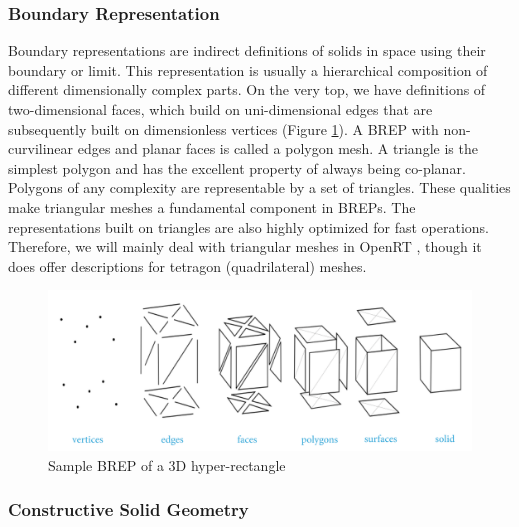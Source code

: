 \documentclass[a4paper,11pt,oneside]{article}
\begin{document}
\subsubsection{Boundary Representation}
    
Boundary representations are indirect definitions of solids in space using their boundary or limit. This representation is usually a hierarchical composition of different dimensionally complex parts. On the very top, we have definitions of two-dimensional faces, which build on uni-dimensional edges that are subsequently built on dimensionless vertices (Figure \ref{fig2:brep_3d_rect}). A BREP with non-curvilinear edges and planar faces is called a polygon mesh. A triangle is the simplest polygon and has the excellent property of always being co-planar. Polygons of any complexity are representable by a set of triangles. These qualities make triangular meshes a fundamental component in BREPs. The representations built on triangles are also highly optimized for fast operations. Therefore, we will mainly deal with triangular meshes in OpenRT \cite{openrt}, though it does offer descriptions for tetragon (quadrilateral) meshes.
    
    
\begin{figure}[ht]
	\begin{center}
		\includegraphics[width=.8\textwidth]{section1/brep-overview.png}
	\end{center}
	\caption{Sample BREP of a 3D hyper-rectangle \cite{wikipedia_2021_mesh_rep}}
	\label{fig2:brep_3d_rect}
\end{figure}
    
\subsubsection{Constructive Solid Geometry}
\end{document}
